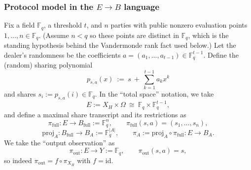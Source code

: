 \documentclass[11pt,a4paper]{article}
\theoremstyle{definition}
\theoremstyle{plain}
\newcommand{\F}{\mathbb{F}}
\begin{document}
\subsubsection{Protocol model in the $E\to B$ language}
Fix a field $\F_q$, a threshold $t$, and $n$ parties with public nonzero evaluation points $1,\dots,n\in\F_q$.
(Assume $n<q$ so these points are distinct in $\F_q$, which is the standing hypothesis behind the Vandermonde rank fact used below.)
Let the dealer's randomness be the coefficients $a=(a_1,\dots,a_{t-1})\in \F_q^{t-1}$.
Define the (random) sharing polynomial
\[
p_{s,a}(x)\ :=\ s\ +\ \sum_{k=1}^{t-1} a_k x^k
\]
and shares $s_i:=p_{s,a}(i)\in\F_q$.
In the ``total space'' notation, we take
\[
E:=X_H\times \Omega\ \cong\ \F_q\times \F_q^{t-1},
\]
and define a maximal share transcript and its restrictions as
\[
\pi_{\mathrm{full}}:E\to B_{\mathrm{full}}:=\F_q^n,\qquad \pi_{\mathrm{full}}(s,a)=(s_1,\dots,s_n),
\]
\[
\mathrm{proj}_A:B_{\mathrm{full}}\to B_A:=\F_q^{|A|},\qquad
\pi_A:=\mathrm{proj}_A\circ \pi_{\mathrm{full}}:E\to B_A.
\]
We take the ``output observation'' as
\[
\pi_{\mathrm{out}}:E\to Y:=\F_q,\qquad \pi_{\mathrm{out}}(s,a)=s,
\]
so indeed $\pi_{\mathrm{out}}=f\circ \pi_{X_H}$ with $f=\mathrm{id}$.
\end{document}
